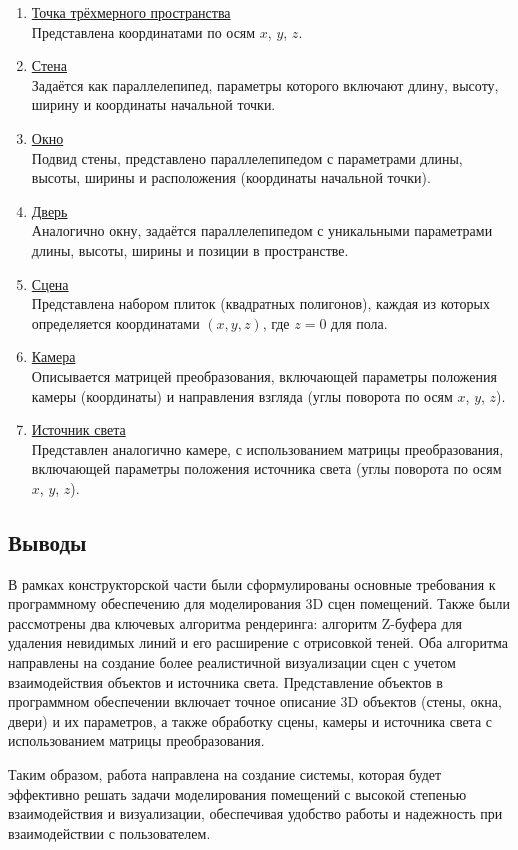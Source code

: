 \begin{enumerate}
\item \underline{Точка трёхмерного пространства} \\  
   Представлена координатами по осям \(x\), \(y\), \(z\).

\item \underline{Стена} \\  
   Задаётся как параллелепипед, параметры которого включают длину, высоту, ширину и координаты начальной точки.

\item \underline{Окно} \\  
   Подвид стены, представлено параллелепипедом с параметрами длины, высоты, ширины и расположения (координаты начальной точки).

\item \underline{Дверь} \\  
   Аналогично окну, задаётся параллелепипедом с уникальными параметрами длины, высоты, ширины и позиции в пространстве.

\item \underline{Сцена} \\  
   Представлена набором плиток (квадратных полигонов), каждая из которых определяется координатами \( (x, y, z) \), где \( z = 0 \) для пола.

\item \underline{Камера} \\  
    Описывается матрицей преобразования, включающей параметры положения камеры (координаты) и направления взгляда (углы поворота по осям \(x\), \(y\), \(z\)).

\item \underline{Источник света} \\  
   Представлен аналогично камере, с использованием матрицы преобразования, включающей параметры положения источника света (углы поворота по осям \(x\), \(y\), \(z\)).
\end{enumerate}


\subsection{Выводы}

\hspace{1.25cm}
В рамках конструкторской части были сформулированы основные требования к программному обеспечению для моделирования 3D сцен помещений. Также были рассмотрены два ключевых алгоритма рендеринга: алгоритм Z-буфера для удаления невидимых линий и его расширение с отрисовкой теней. Оба алгоритма направлены на создание более реалистичной визуализации сцен с учетом взаимодействия объектов и источника света. Представление объектов в программном обеспечении включает точное описание 3D объектов (стены, окна, двери) и их параметров, а также обработку сцены, камеры и источника света с использованием матрицы преобразования.

Таким образом, работа направлена на создание системы, которая будет эффективно решать задачи моделирования помещений с высокой степенью взаимодействия и визуализации, обеспечивая удобство работы и надежность при взаимодействии с пользователем.


\newpage